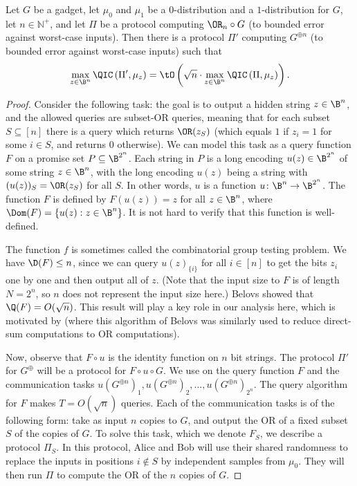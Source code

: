 \begin{lemma}\label{lem:all_to_OR}
Let $G$ be a gadget, let $\mu_0$ and $\mu_1$ be a $0$-distribution
and a $1$-distribution for $G$, let $n\in\mathbb{N}^+$, and
let $\Pi$ be a protocol computing $\OR_n\circ G$ (to bounded
error against worst-case inputs). Then there is a protocol $\Pi'$
computing $G^{\oplus n}$
(to bounded error against worst-case inputs) such that
\[\max_{z\in\B^n}\QIC\left(\Pi',\mu_z\right)
=\tO\left(\sqrt{n}\cdot \max_{z\in\B^n}\QIC\left(\Pi,\mu_z\right)\right).\]
\end{lemma}

\begin{proof}
Consider the following task: the goal is to output
a hidden string $z\in\B^n$, and the allowed queries are subset-OR
queries, meaning that for each subset $S\subseteq[n]$ there is
a query which returns $\OR(z_S)$ (which equals $1$ if $z_i=1$ for
some $i\in S$, and returns $0$ otherwise). We can model
this task as a query function $F$ on a promise set $P\subseteq\B^{2^n}$.
Each string in $P$ is a long encoding $u(z)\in\B^{2^n}$
of some string $z\in\B^n$,
with the long encoding $u(z)$ being a string with $(u(z))_S=\OR(z_S)$
for all $S$. In other words, $u$ is a function $u\colon\B^n\to\B^{2^n}$.
The function $F$ is defined by $F(u(z))=z$ for all
$z\in\B^n$, where $\Dom(F)=\{u(z):z\in\B^n\}$.
It is not hard to verify that this function is well-defined.

The function $f$ is sometimes called the combinatorial group testing
problem. We have $\D(F)\le n$, since we can query $u(z)_{\{i\}}$
for all $i\in[n]$ to get the bits $z_i$ one by one and then output
all of $z$. (Note that the input size to $F$ is of length $N=2^n$,
so $n$ does not represent the input size here.)
Belovs \cite{Bel15} showed that $\Q(F)=O(\sqrt{n})$.
This result will play a key role in our analysis here,
which is motivated by \cite{BBGK18}
(where this algorithm of Belovs was similarly used to reduce
direct-sum computations to OR computations).

Now, observe that $F\circ u$ is the identity function on $n$ bit strings.
The protocol $\Pi'$ for $G^{\oplus}$ will be a protocol
for $F\circ u\circ G$. We use 
on the query function $F$ and the communication tasks
$u(G^{\oplus n})_1,u(G^{\oplus n})_2,\dots,u(G^{\oplus n})_{2^n}$.
The query algorithm for $F$ makes $T=O(\sqrt{n})$ queries.
Each of the communication tasks is of the following form:
take as input $n$ copies to $G$, and output the OR
of a fixed subset $S$ of the copies of $G$. To solve this task,
which we denote $F_S$, we describe a protocol $\Pi_S$.
In this protocol, Alice and Bob will use their shared randomness
to replace the inputs in positions $i\notin S$ by independent
samples from $\mu_0$. They will then run $\Pi$ to compute the OR
of the $n$ copies of $G$.


\end{proof}

